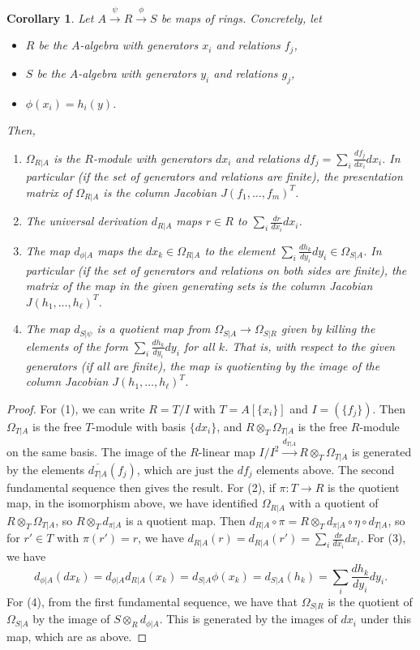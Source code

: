 \documentclass{amsart}[12pt]
\numberwithin{equation}{section}
\theoremstyle{plain} %
\newtheorem{cor}[equation]{Corollary}
\theoremstyle{definition}
\theoremstyle{remark}
\newcommand{\xra}[1]{\xrightarrow{#1}}
\begin{document}
\begin{cor} Let $A\xra{\psi} R\xra{\phi} S$ be maps of rings. Concretely, let
\begin{itemize}
\item $R$ be the $A$-algebra with generators $x_i$ and relations $f_j$,
\item $S$ be the $A$-algebra with generators $y_i$ and relations $g_j$,
\item $\phi(x_i)=h_i(y)$.
\end{itemize}
Then,
\begin{enumerate}
\item $\Omega_{R|A}$ is the $R$-module with generators $dx_i$ and relations $df_j=\sum_i \frac{df_j}{dx_i} dx_i$. In particular (if the set of generators and relations are finite), the presentation matrix of $\Omega_{R|A}$ is the column Jacobian $J(f_1,\dots,f_m)^T$.
\item The universal derivation $d_{R|A}$ maps $r\in R$ to $\sum_{i} \frac{dr}{dx_i} dx_i$. 
\item The map $d_{\phi|A}$ maps the $ dx_k \in \Omega_{R|A}$ to the element $\sum_i \frac{dh_k}{dy_i} dy_i \in \Omega_{S|A}$. In particular (if the set of generators and relations on both sides are finite), the matrix of the map in the given generating sets is the column Jacobian $J(h_1,\dots,h_\ell)^T$.
\item The map $d_{S|\psi}$ is a quotient map from $\Omega_{S|A} \to \Omega_{S|R}$ given by killing the elements of the form $\sum_i \frac{dh_k}{dy_i} dy_i$ for all $k$. That is, with respect to the given generators (if all are finite), the map is quotienting by the image of the column Jacobian $J(h_1,\dots,h_\ell)^T$.
\end{enumerate}
\end{cor}

\begin{proof}
For (1),
we can write $R=T/I$ with $T=A[\{x_i\}]$ and  $I=(\{f_j\})$. Then $\Omega_{T|A}$ is the free $T$-module with basis $\{dx_i\}$, and $R \otimes_T \Omega_{T|A}$ is the free $R$-module on the same basis. The image of the $R$-linear map $I/I^2 \xra{\overline{d_{T|A}} } R \otimes_T \Omega_{T|A}$ is generated by the elements $\overline{d_{T|A}}(f_j)$, which are just the $df_j$ elements above. The second fundamental sequence then gives the result.
For (2), if $\pi:T\to R$ is the quotient map, in the isomorphism above, we have identified $\Omega_{R|A}$ with a quotient of $R\otimes_T \Omega_{T|A}$, so $R\otimes_T d_{\pi|A}$ is a quotient map. Then $d_{R|A} \circ \pi = R\otimes_T {d_{\pi|A} }\circ \eta \circ d_{T|A}$, so for $r'\in T$ with $\pi(r')=r$, we have $d_{R|A}(r)=d_{R|A}(r')=\sum_i \frac{dr}{dx_i} dx_i$. 
For (3), we  have \[d_{\phi|A}(dx_k)=d_{\phi|A} d_{R|A} (x_k) = d_{S|A} \phi(x_k) = d_{S|A}(h_k) = \sum_i \frac{dh_k}{dy_i} dy_i.\]
For (4), from the first fundamental sequence, we have that $\Omega_{S|R}$ is the quotient of $\Omega_{S|A}$ by the image of $S\otimes_R d_{\phi|A}$. This is generated by the images of $dx_i$ under this map, which are as above.
\end{proof}
\end{document}
